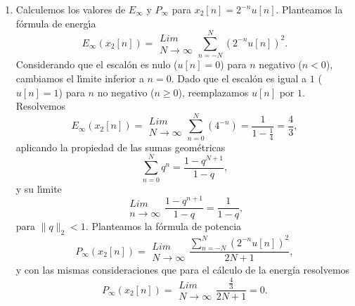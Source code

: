 \begin{enumerate}
\item Calculemos los valores de $E_{\infty }$ y $P_{\infty }$ para 
$x_{2}[n]=2^{-n}u\left[ n\right].$
Planteamos la f\'{o}rmula de energ\'{\i}a
  \begin{equation}
    E_{\infty }\left( x_{2}\left[ n\right] \right) = 
    \begin{array}{c}
      Lim \\ 
      N\rightarrow \infty
    \end{array}
    \sum_{n=-N}^{N}\left( 2^{-n}u\left[ n\right] \right) ^{2}.
  \end{equation}
Considerando que el escal\'{o}n es nulo ($u[n] = 0$) para $n$ negativo
($n < 0$), cambiamos el l\'{\i}mite inferior a $n = 0$. Dado que el escal\'{o}n
es igual a $1$ ($u[n] = 1$) para $n$ no negativo ($n \geq 0$), reemplazamos $u[n]$ por $1$.
Resolvemos
  \begin{equation}
    E_{\infty }\left( x_{2}\left[ n\right] \right)= 
    \begin{array}{c}
      Lim \\ 
      N\rightarrow \infty
    \end{array}
    \sum_{n=0}^{N}\left( 4^{-n}\right) =\frac{1}{1-\frac{1}{4}}=\frac{4}{3},
  \end{equation}
aplicando la propiedad de las sumas geom\'{e}tricas
\begin{equation}
  \sum_{n = 0}^{N} q^{n} = \frac{1-q^{N+1}}{1-q},
\end{equation}
y su l\'{\i}mite
\begin{equation}
  \begin{array}{c}
    Lim \\
    n \rightarrow \infty
  \end{array}
  \frac{1-q^{n+1}}{1-q} =   \frac{1}{1-q},
\end{equation}
para $\parallel q \parallel_{2} < 1$.
Planteamos la f\'{o}rmula de potencia
  \begin{equation}
    P_{\infty }\left( x_{2}\left[ n\right] \right) = 
    \begin{array}{c}
      Lim \\ 
      N\rightarrow \infty
    \end{array}
    \frac{\sum_{n=-N}^{N}\left( 2^{-n}u\left[ n\right] \right) ^{2}}{2N+1},
  \end{equation}
y con las mismas consideraciones que para el c\'{a}lculo de la
energ\'{i}a resolvemos
  \begin{equation}
    P_{\infty }\left( x_{2}\left[ n\right] \right) = 
    \begin{array}{c}
      Lim \\ 
      N\rightarrow \infty
    \end{array}
    \frac{\frac{4}{3}}{2N+1}=0.
  \end{equation}


\end{enumerate}
